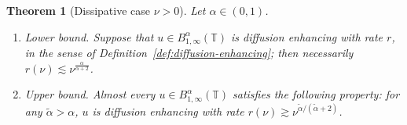 \documentclass[11pt,oneside,reqno]{amsart}
\newenvironment{enumeratealpha}{\begin{enumerate}[a{\textup{)}}] }{\end{enumerate}}
\newtheorem{theorem}{Theorem}[section]
\numberwithin{equation}{section}
\begin{document}
\begin{theorem}[Dissipative case $\nu > 0$]
  \label{thm:main-thm-enhanced}Let $\alpha \in (0, 1)$.
  \begin{enumeratealpha}
    \item Lower bound. Suppose that $u \in B^{\alpha}_{1, \infty}
    (\mathbb{T})$ is diffusion enhancing with rate $r$, in the sense of
    Definition~\ref{def:diffusion-enhancing}; then necessarily $r (\nu)
    \lesssim \nu^{\frac{\alpha}{\alpha + 2}}$.
    
    \item Upper bound. Almost every $u \in B^{\alpha}_{1, \infty}
    (\mathbb{T})$ satisfies the following property: for any $\tilde{\alpha} >
    \alpha$, $u$ is diffusion enhancing with rate $r (\nu) \gtrsim
    \nu^{\tilde{\alpha} / (\tilde{\alpha} + 2)}$.
  \end{enumeratealpha}
\end{theorem}
\end{document}
